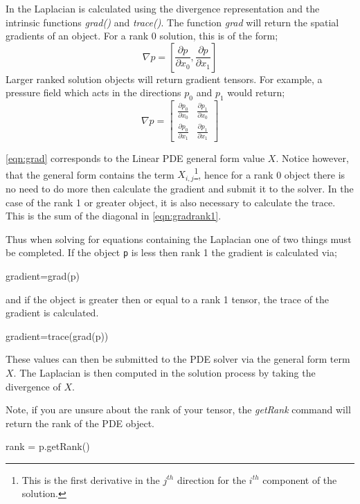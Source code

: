 In \esc the Laplacian is calculated using the divergence representation and the
intrinsic functions \textit{grad()} and \textit{trace()}. The function
\textit{grad{}} will return the spatial gradients of an object.  
For a rank 0 solution, this is of the form;
\begin{equation}
 \nabla p = \left[
	   \frac{\partial p}{\partial x _{0}},  
	   \frac{\partial p}{\partial x _{1}}
                  \right]
\label{eqn:grad}
\end{equation}
Larger ranked solution objects will return gradient tensors. For example, a
pressure field which acts in the directions $p _{0}$ and $p
_{1}$ would return;
\begin{equation}
  \nabla p = \begin{bmatrix}
	   \frac{\partial p _{0}}{\partial x _{0}} &
		\frac{\partial p _{1}}{\partial x _{0}} \\
	  \frac{\partial p _{0}}{\partial x _{1}} &
		\frac{\partial p _{1}}{\partial x _{1}} 
                  \end{bmatrix}
\label{eqn:gradrank1}
\end{equation}

\autoref{eqn:grad} corresponds to the Linear PDE general form value
$X$. Notice however, that the general form contains the term $X
_{i,j}$\footnote{This is the first derivative in the $j^{th}$
direction for the $i^{th}$ component of the solution.},
hence for a rank 0 object there is no need to do more then calculate the
gradient and submit it to the solver. In the case of the rank 1 or greater
object, it is also necessary to calculate the trace. This is the sum of the
diagonal in \autoref{eqn:gradrank1}. 

Thus when solving for equations containing the Laplacian one of two things must
be completed. If the object \verb!p! is less then rank 1 the gradient is
calculated via;
\begin{python}
gradient=grad(p)
\end{python}
and if the object is greater then or equal to a rank 1 tensor, the trace of
the gradient is calculated.
\begin{python}
 gradient=trace(grad(p))
\end{python}
These values can then be submitted to the PDE solver via the general form term
$X$. The Laplacian is then computed in the solution process by taking the
divergence of $X$.

Note, if you are unsure about the rank of your tensor, the \textit{getRank}
command will return the rank of the PDE object.
\begin{python}
 rank = p.getRank()
\end{python}


